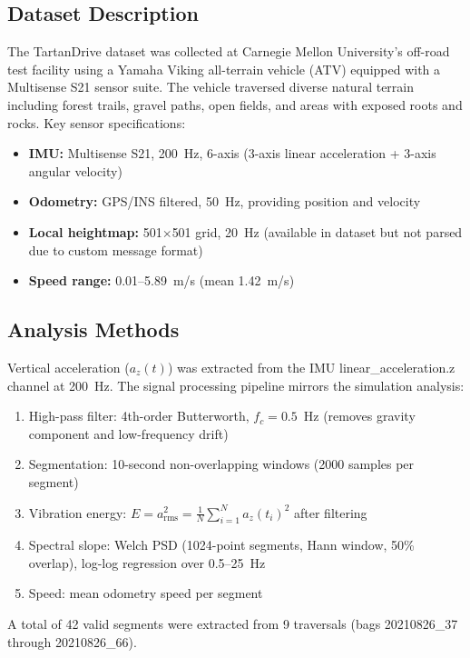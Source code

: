 \documentclass[11pt]{article}
\begin{document}
\subsection{Dataset Description}

The TartanDrive dataset\cite{Triest2022} was collected at Carnegie Mellon University's off-road test facility using a Yamaha Viking all-terrain vehicle (ATV) equipped with a Multisense S21 sensor suite. The vehicle traversed diverse natural terrain including forest trails, gravel paths, open fields, and areas with exposed roots and rocks. Key sensor specifications:

\begin{itemize}
\item \textbf{IMU:} Multisense S21, 200~Hz, 6-axis (3-axis linear acceleration + 3-axis angular velocity)
\item \textbf{Odometry:} GPS/INS filtered, 50~Hz, providing position and velocity
\item \textbf{Local heightmap:} 501$\times$501 grid, 20~Hz (available in dataset but not parsed due to custom message format)
\item \textbf{Speed range:} 0.01--5.89~m/s (mean 1.42~m/s)
\end{itemize}

\subsection{Analysis Methods}

Vertical acceleration ($a_z(t)$) was extracted from the IMU linear\_acceleration.z channel at 200~Hz. The signal processing pipeline mirrors the simulation analysis:

\begin{enumerate}
\item High-pass filter: 4th-order Butterworth, $f_c = 0.5$~Hz (removes gravity component and low-frequency drift)
\item Segmentation: 10-second non-overlapping windows (2000 samples per segment)
\item Vibration energy: $E = a_{\mathrm{rms}}^2 = \frac{1}{N}\sum_{i=1}^N a_z(t_i)^2$ after filtering
\item Spectral slope: Welch PSD (1024-point segments, Hann window, 50\% overlap), log-log regression over 0.5--25~Hz
\item Speed: mean odometry speed per segment
\end{enumerate}

A total of 42 valid segments were extracted from 9 traversals (bags 20210826\_37 through 20210826\_66).
\end{document}
